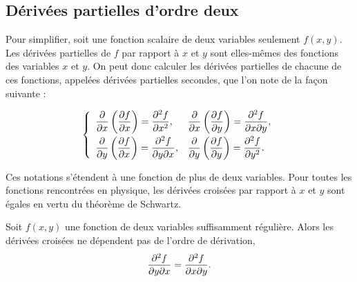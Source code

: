 \subsection{Dérivées partielles d'ordre deux}

Pour simplifier, soit une fonction scalaire de deux variables seulement $f(x,y)$. Les dérivées partielles de $f$ par rapport à $x$ et $y$ sont elles-mêmes des fonctions des variables $x$ et $y$.
On peut donc calculer les dérivées partielles de chacune de ces fonctions, appelées dérivées partielles secondes, que l'on note de la façon suivante :

$$
 \left\{
\begin{array}{ll}
\displaystyle
\frac{\partial{}}{\partial{x}}\left(\frac{\partial{f}}{\partial{x}}\right) = \frac{\partial^2{f}}{\partial{x}^2}, & \displaystyle\frac{\partial{}}{\partial{x}}\left(\frac{\partial{f}}{\partial{y}}\right) = \frac{\partial^2{f}}{\partial{x}\partial{y}}, \\[0.3cm]
\displaystyle\frac{\partial{}}{\partial{y}}\left(\frac{\partial{f}}{\partial{x}}\right) = \frac{\partial^2{f}}{\partial{y}\partial{x}}, & \displaystyle\frac{\partial{}}{\partial{y}}\left(\frac{\partial{f}}{\partial{y}}\right) = \frac{\partial^2{f}}{\partial{y}^2}.  \\
\end{array}
 \right.
 $$


Ces notations s'étendent à une fonction de plus de deux variables.  Pour toutes les fonctions rencontrées en physique, les dérivées croisées par rapport à $x$ et $y$ sont égales en vertu du théorème de Schwartz.
\begin{theorem}
Soit $f(x,y)$ une fonction de deux variables suffisamment régulière. Alors les dérivées croisées ne dépendent pas de l'ordre de dérivation,
$$
\frac{\partial^2{f}}{\partial{y}\partial{x}} = \frac{\partial^2{f}}{\partial{x}\partial{y}}.
$$
\end{theorem}


